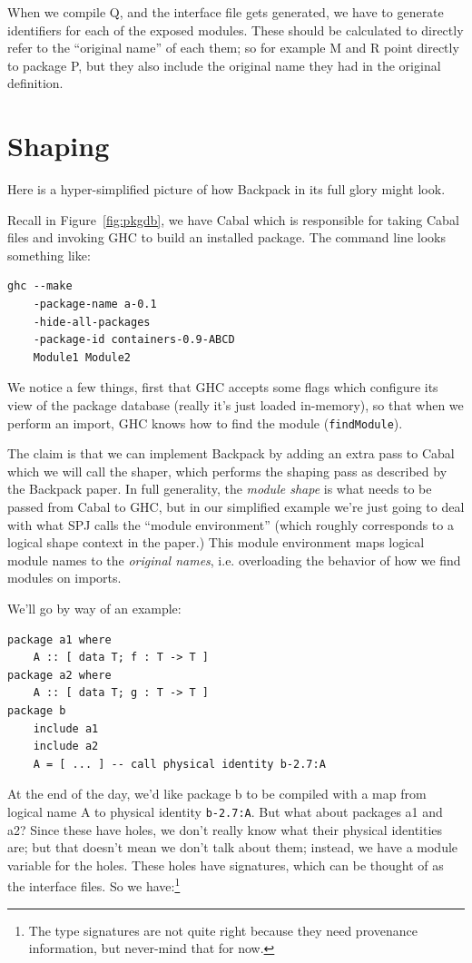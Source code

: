 \documentclass{article}
\begin{document}
When we compile Q, and the interface file gets generated, we have
to generate identifiers for each of the exposed modules.  These should
be calculated to directly refer to the ``original name'' of each them;
so for example M and R point directly to package P, but they also
include the original name they had in the original definition.

\section{Shaping}\label{sec:shaping}

Here is a hyper-simplified picture of how Backpack in its full glory might look.

Recall in Figure~\ref{fig:pkgdb}, we have Cabal which is responsible for
taking Cabal files and invoking GHC to build an installed package.  The
command line looks something like:

\begin{verbatim}
ghc --make
    -package-name a-0.1
    -hide-all-packages
    -package-id containers-0.9-ABCD
    Module1 Module2
\end{verbatim}

We notice a few things, first that GHC accepts some flags which
configure its view of the package database (really it's just loaded
in-memory), so that when we perform an import, GHC knows how to find the
module (\verb|findModule|).

The claim is that we can implement Backpack by adding an extra pass
to Cabal which we will call the shaper, which performs the shaping pass
as described by the Backpack paper.  In full generality, the \emph{module shape}
is what needs to be passed from Cabal to GHC, but in our simplified example
we're just going to deal with what SPJ calls the ``module environment'' (which
roughly corresponds to a logical shape context in the paper.)  This module
environment maps logical module names to the \emph{original names}, i.e.
overloading the behavior of how we find modules on imports.

We'll go by way of an example:

\begin{verbatim}
package a1 where
    A :: [ data T; f : T -> T ]
package a2 where
    A :: [ data T; g : T -> T ]
package b
    include a1
    include a2
    A = [ ... ] -- call physical identity b-2.7:A
\end{verbatim}

At the end of the day, we'd like package b to be compiled with a map from
logical name A to physical identity \verb|b-2.7:A|. But what about packages
a1 and a2?  Since these have holes, we don't really know what their physical
identities are; but that doesn't mean we don't talk about them; instead,
we have a module variable for the holes.  These holes have signatures, which can be thought
of as the interface files.  So we have:\footnote{The type signatures are not quite right because they need provenance information, but never-mind that for now.} \\
\end{document}
